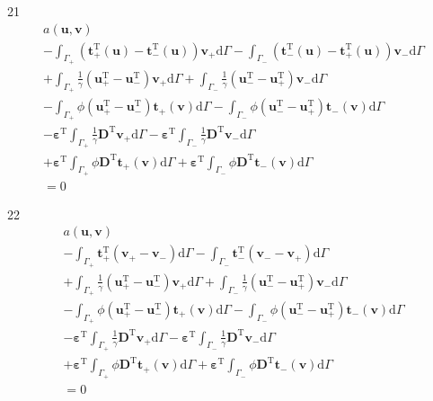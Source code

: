 \documentclass[a4paper,12pt]{article}
\begin{document}
21
\begin{equation}
\begin{split}
a(\mathbf{u},\mathbf{v})
\\-
\int_{\Gamma_+}
(\mathbf{t}_+^\textrm{T}(\mathbf{u})-\mathbf{t}_-^\textrm{T}(\mathbf{u}))\mathbf{v}_+
\textrm{d}\Gamma
-
\int_{\Gamma_-}
(\mathbf{t}_-^\textrm{T}(\mathbf{u})-\mathbf{t}_+^\textrm{T}(\mathbf{u}))\mathbf{v}_-
\textrm{d}\Gamma
\\+
\int_{\Gamma_+}
\frac{1}{\gamma}
(\mathbf{u}_+^\textrm{T} - \mathbf{u}_-^\textrm{T})
\mathbf{v}_+
\textrm{d}\Gamma
+
\int_{\Gamma_-}
\frac{1}{\gamma}
(\mathbf{u}_-^\textrm{T} - \mathbf{u}_+^\textrm{T})
\mathbf{v}_-
\textrm{d}\Gamma
\\-
\int_{\Gamma_+}
\phi
(\mathbf{u}_+^\textrm{T} - \mathbf{u}_-^\textrm{T})
\mathbf{t}_+(\mathbf{v})
\textrm{d}\Gamma
-
\int_{\Gamma_-}
\phi
(\mathbf{u}_-^\textrm{T} - \mathbf{u}_+^\textrm{T})
\mathbf{t}_-(\mathbf{v})
\textrm{d}\Gamma
\\-
{\boldsymbol\varepsilon}^\textrm{T}
\int_{\Gamma_+}
\frac{1}{\gamma}
\mathbf{D}^\textrm{T}
\mathbf{v}_+
\textrm{d}\Gamma
-
{\boldsymbol\varepsilon}^\textrm{T}
\int_{\Gamma_-}
\frac{1}{\gamma}
\mathbf{D}^\textrm{T}
\mathbf{v}_-
\textrm{d}\Gamma
\\+
{\boldsymbol\varepsilon}^\textrm{T}
\int_{\Gamma_+}
\phi\mathbf{D}^\textrm{T}
\mathbf{t}_+(\mathbf{v})
\textrm{d}\Gamma
+
{\boldsymbol\varepsilon}^\textrm{T}
\int_{\Gamma_-}
\phi\mathbf{D}^\textrm{T}
\mathbf{t}_-(\mathbf{v})
\textrm{d}\Gamma
\\=
0
\end{split}
\end{equation}

22
\begin{equation}
\begin{split}
a(\mathbf{u},\mathbf{v})
\\-
\int_{\Gamma_+}
\mathbf{t}_+^\textrm{T}(\mathbf{v}_+ - \mathbf{v}_-)
\textrm{d}\Gamma
-
\int_{\Gamma_-}
\mathbf{t}_-^\textrm{T}(\mathbf{v}_- - \mathbf{v}_+)
\textrm{d}\Gamma
\\+
\int_{\Gamma_+}
\frac{1}{\gamma}
(\mathbf{u}_+^\textrm{T} - \mathbf{u}_-^\textrm{T})
\mathbf{v}_+
\textrm{d}\Gamma
+
\int_{\Gamma_-}
\frac{1}{\gamma}
(\mathbf{u}_-^\textrm{T} - \mathbf{u}_+^\textrm{T})
\mathbf{v}_-
\textrm{d}\Gamma
\\-
\int_{\Gamma_+}
\phi
(\mathbf{u}_+^\textrm{T} - \mathbf{u}_-^\textrm{T})
\mathbf{t}_+(\mathbf{v})
\textrm{d}\Gamma
-
\int_{\Gamma_-}
\phi
(\mathbf{u}_-^\textrm{T} - \mathbf{u}_+^\textrm{T})
\mathbf{t}_-(\mathbf{v})
\textrm{d}\Gamma
\\-
{\boldsymbol\varepsilon}^\textrm{T}
\int_{\Gamma_+}
\frac{1}{\gamma}
\mathbf{D}^\textrm{T}
\mathbf{v}_+
\textrm{d}\Gamma
-
{\boldsymbol\varepsilon}^\textrm{T}
\int_{\Gamma_-}
\frac{1}{\gamma}
\mathbf{D}^\textrm{T}
\mathbf{v}_-
\textrm{d}\Gamma
\\+
{\boldsymbol\varepsilon}^\textrm{T}
\int_{\Gamma_+}
\phi\mathbf{D}^\textrm{T}
\mathbf{t}_+(\mathbf{v})
\textrm{d}\Gamma
+
{\boldsymbol\varepsilon}^\textrm{T}
\int_{\Gamma_-}
\phi\mathbf{D}^\textrm{T}
\mathbf{t}_-(\mathbf{v})
\textrm{d}\Gamma
\\=
0
\end{split}
\end{equation}
\end{document}
